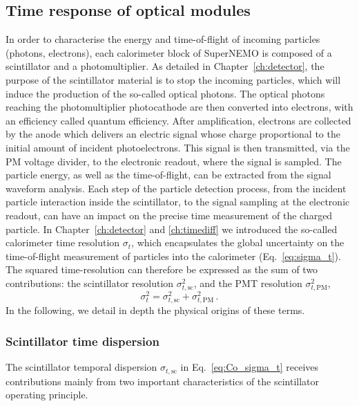 \subsection{Time response of optical modules}
\label{subsec:OMtimeResponse}

In order to characterise the energy and time-of-flight of incoming particles (photons, electrons), each calorimeter block of SuperNEMO is composed of a scintillator and a photomultiplier.
As detailed in Chapter~\ref{ch:detector}, the purpose of the scintillator material is to stop the incoming particles, which will induce the production of the so-called optical photons.
The optical photons reaching the photomultiplier photocathode are then converted into electrons, with an efficiency called quantum efficiency.
After amplification, electrons are collected by the anode which delivers an electric signal whose charge proportional to the initial amount of incident photoelectrons.
This signal is then transmitted, via the PM voltage divider, to the electronic readout, where the signal is sampled.
The particle energy, as well as the time-of-flight, can be extracted from the signal waveform analysis.
Each step of the particle detection process, from the incident particle interaction inside the scintillator, to the signal sampling at the electronic readout, can have an impact on the precise time measurement of the charged particle.
In Chapter~\ref{ch:detector} and \ref{ch:timediff} we introduced the so-called calorimeter time resolution $\sigma_t$, which encapsulates the global uncertainty on the time-of-flight measurement of particles into the calorimeter (Eq.~\eqref{eq:sigma_t}).
The squared time-resolution can therefore be expressed as the sum of two contributions:
the scintillator resolution $\sigma_{t, \textrm{sc}}^{2}$, and the PMT resolution $\sigma_{t, \textrm{PM}}^{2}$,
\begin{equation}
  \sigma_{t}^{2}=\sigma_{t,\text{sc}}^{2}+\sigma_{t,\text{PM}}^{2}\,.
  \label{eq:Co_sigma_t}
\end{equation}
In the following, we detail in depth the physical origins of these terms.

\subsubsection*{Scintillator time dispersion}
The scintillator temporal dispersion $\sigma_{t,\text{sc}}$ in Eq.~\eqref{eq:Co_sigma_t} receives contributions mainly from two important characteristics of the scintillator operating principle.

